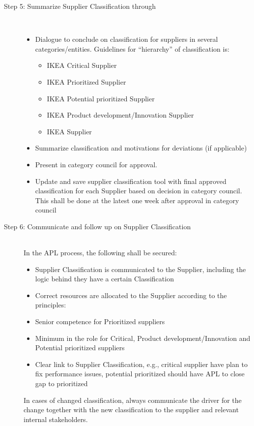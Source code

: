 \documentclass[oneside,12pt]{article}%
\begin{document}
\begin{description}
  \item[Step 5: Summarize Supplier Classification through] \hfill \\
  \begin{itemize}
    \item Dialogue to conclude on classification for suppliers in several categories/entities. Guidelines for ``hierarchy'' of classification is:
      \begin{itemize}
      \item IKEA Critical Supplier
      \item IKEA Prioritized Supplier
      \item IKEA Potential prioritized Supplier
      \item IKEA Product development/Innovation Supplier
      \item IKEA Supplier
      \end{itemize}
    \item Summarize classification and motivations for deviations (if applicable)
    \item Present in category council for approval.
    \item Update and save supplier classification tool with final approved classification for each Supplier based on decision in category council. This shall be done at the latest one week after approval in category council

  \end{itemize}
  \item[Step 6: Communicate and follow up on Supplier Classification ] \hfill \\
  In the APL process, the following shall be secured:
  \begin{itemize}
    \item Supplier Classification is communicated to the Supplier, including the logic behind they have a certain Classification
    \item Correct resources are allocated to the Supplier according to the principles:
    \item Senior competence for Prioritized suppliers
    \item Minimum in the role for Critical, Product development/Innovation and Potential prioritized suppliers
    \item Clear link to Supplier Classification, e.g., critical supplier have plan to fix performance issues, potential prioritized should have APL to close gap to prioritized
  \end{itemize}
  In cases of changed classification, always communicate the driver for the change together with the new classification to the supplier and relevant internal stakeholders.

\end{description}
\end{document}

